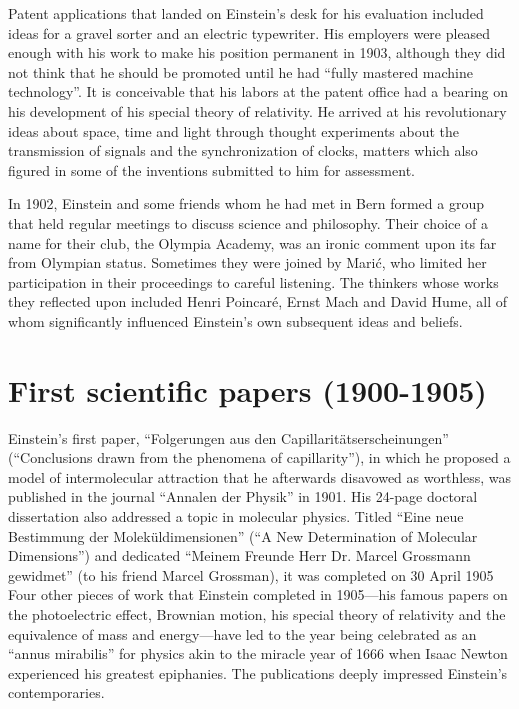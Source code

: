 \documentclass[twoside]{memoir}
\begin{document}
Patent applications that landed on Einstein's desk for his evaluation included ideas for a gravel sorter and an electric typewriter. His employers were pleased enough with his work to make his position permanent in 1903, although they did not think that he should be promoted until he had \enquote{fully mastered machine technology}. It is conceivable that his labors at the patent office had a bearing on his development of his special theory of relativity. He arrived at his revolutionary ideas about space, time and light through thought experiments about the transmission of signals and the synchronization of clocks, matters which also figured in some of the inventions submitted to him for assessment.

In 1902, Einstein and some friends whom he had met in Bern formed a group that held regular meetings to discuss science and philosophy. Their choice of a name for their club, the Olympia Academy, was an ironic comment upon its far from Olympian status. Sometimes they were joined by Marić, who limited her participation in their proceedings to careful listening. The thinkers whose works they reflected upon included Henri Poincaré, Ernst Mach and David Hume, all of whom significantly influenced Einstein's own subsequent ideas and beliefs.
\chapter{First scientific papers (1900-1905)}
Einstein's first paper, \enquote{Folgerungen aus den Capillaritätserscheinungen} (\enquote{Conclusions drawn from the phenomena of capillarity}), in which he proposed a model of intermolecular attraction that he afterwards disavowed as worthless, was published in the journal \enquote{Annalen der Physik} in 1901. His 24-page doctoral dissertation also addressed a topic in molecular physics. Titled \enquote{Eine neue Bestimmung der Moleküldimensionen} (\enquote{A New Determination of Molecular Dimensions}) and dedicated \enquote{Meinem Freunde Herr Dr. Marcel Grossmann gewidmet} (to his friend Marcel Grossman), it was completed on 30 April 1905 Four other pieces of work that Einstein completed in 1905---his famous papers on the photoelectric effect, Brownian motion, his special theory of relativity and the equivalence of mass and energy---have led to the year being celebrated as an \enquote{annus mirabilis} for physics akin to the miracle year of 1666 when Isaac Newton experienced his greatest epiphanies. The publications deeply impressed Einstein's contemporaries.
\end{document}
